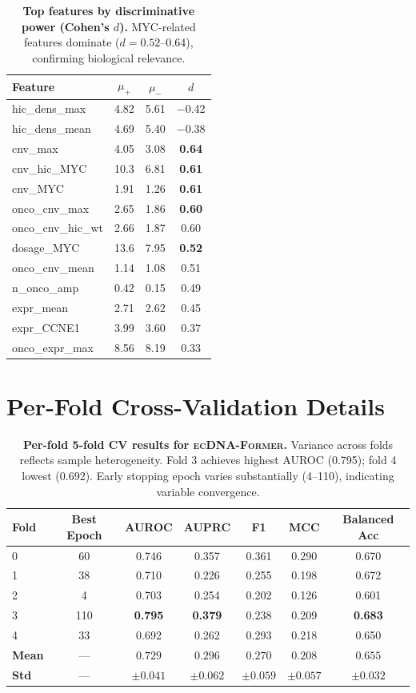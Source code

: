 \documentclass[sigconf,anonymous]{acmart}
\newcommand{\former}{\textsc{ecDNA-Former}}
\begin{document}
\begin{table}[h]
\caption{\textbf{Top features by discriminative power (Cohen's $d$).} MYC-related features dominate ($d = 0.52$--$0.64$), confirming biological relevance.}
\label{tab:feature_effects}
\centering
\footnotesize
\begin{tabular}{@{}lccc@{}}
\toprule
Feature & $\mu_{+}$ & $\mu_{-}$ & $d$ \\
\midrule
hic\_dens\_max & 4.82 & 5.61 & $-$0.42 \\
hic\_dens\_mean & 4.69 & 5.40 & $-$0.38 \\
cnv\_max & 4.05 & 3.08 & \textbf{0.64} \\
cnv\_hic\_MYC & 10.3 & 6.81 & \textbf{0.61} \\
cnv\_MYC & 1.91 & 1.26 & \textbf{0.61} \\
onco\_cnv\_max & 2.65 & 1.86 & \textbf{0.60} \\
onco\_cnv\_hic\_wt & 2.66 & 1.87 & 0.60 \\
dosage\_MYC & 13.6 & 7.95 & \textbf{0.52} \\
onco\_cnv\_mean & 1.14 & 1.08 & 0.51 \\
n\_onco\_amp & 0.42 & 0.15 & 0.49 \\
expr\_mean & 2.71 & 2.62 & 0.45 \\
expr\_CCNE1 & 3.99 & 3.60 & 0.37 \\
onco\_expr\_max & 8.56 & 8.19 & 0.33 \\
\bottomrule
\end{tabular}
\end{table}


\section{Per-Fold Cross-Validation Details}
\label{app:perfold}

\begin{table}[h]
\caption{\textbf{Per-fold 5-fold CV results for \former{}.} Variance across folds reflects sample heterogeneity. Fold 3 achieves highest AUROC (0.795); fold 4 lowest (0.692). Early stopping epoch varies substantially (4--110), indicating variable convergence.}
\label{tab:perfold}
\centering
\small
\begin{tabular}{@{}lcccccc@{}}
\toprule
Fold & Best Epoch & AUROC & AUPRC & F1 & MCC & Balanced Acc \\
\midrule
0 & 60 & 0.746 & 0.357 & 0.361 & 0.290 & 0.670 \\
1 & 38 & 0.710 & 0.226 & 0.255 & 0.198 & 0.672 \\
2 & 4 & 0.703 & 0.254 & 0.202 & 0.126 & 0.601 \\
3 & 110 & \textbf{0.795} & \textbf{0.379} & 0.238 & 0.209 & \textbf{0.683} \\
4 & 33 & 0.692 & 0.262 & 0.293 & 0.218 & 0.650 \\
\midrule
\textbf{Mean} & --- & $0.729$ & $0.296$ & $0.270$ & $0.208$ & $0.655$ \\
\textbf{Std} & --- & $\pm 0.041$ & $\pm 0.062$ & $\pm 0.059$ & $\pm 0.057$ & $\pm 0.032$ \\
\bottomrule
\end{tabular}
\end{table}
\end{document}
